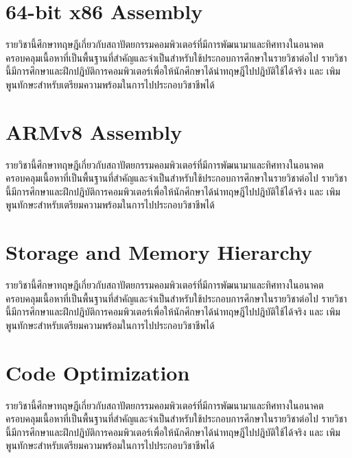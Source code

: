 \documentclass[
  notoc %
]{tufte-book}
\begin{document}
\hypertarget{sec:x86_64assembly}{%
\chapter{64-bit x86 Assembly}\label{sec:x86_64assembly}}

รายวิชานี้ศึกษาทฤษฎีเกี่ยวกับสถาปัตยกรรมคอมพิวเตอร์ที่มีการพัฒนามาและทิศทางในอนาคต
ครอบคลุมเนื้อหาที่เป็นพื้นฐานที่สำคัญและจำเป็นสำหรับใช้ประกอบการศึกษาในรายวิชาต่อไป
รายวิชานี้มีการศึกษาและฝึกปฎิบัติการคอมพิวเตอร์เพื่อให้นักศึกษาได้นำทฤษฎีไปปฎิบัติใช้ได้จริง
และ เพิมพูนทักษะสำหรับเตรียมความพร้อมในการไปประกอบวิชาชีพได้

\hypertarget{sec:armv8assembly}{%
\chapter{ARMv8 Assembly}\label{sec:armv8assembly}}

รายวิชานี้ศึกษาทฤษฎีเกี่ยวกับสถาปัตยกรรมคอมพิวเตอร์ที่มีการพัฒนามาและทิศทางในอนาคต
ครอบคลุมเนื้อหาที่เป็นพื้นฐานที่สำคัญและจำเป็นสำหรับใช้ประกอบการศึกษาในรายวิชาต่อไป
รายวิชานี้มีการศึกษาและฝึกปฎิบัติการคอมพิวเตอร์เพื่อให้นักศึกษาได้นำทฤษฎีไปปฎิบัติใช้ได้จริง
และ เพิมพูนทักษะสำหรับเตรียมความพร้อมในการไปประกอบวิชาชีพได้

\hypertarget{sec:storagememorg}{%
\chapter{Storage and Memory Hierarchy}\label{sec:storagememorg}}

รายวิชานี้ศึกษาทฤษฎีเกี่ยวกับสถาปัตยกรรมคอมพิวเตอร์ที่มีการพัฒนามาและทิศทางในอนาคต
ครอบคลุมเนื้อหาที่เป็นพื้นฐานที่สำคัญและจำเป็นสำหรับใช้ประกอบการศึกษาในรายวิชาต่อไป
รายวิชานี้มีการศึกษาและฝึกปฎิบัติการคอมพิวเตอร์เพื่อให้นักศึกษาได้นำทฤษฎีไปปฎิบัติใช้ได้จริง
และ เพิมพูนทักษะสำหรับเตรียมความพร้อมในการไปประกอบวิชาชีพได้

\hypertarget{sec:codeopt}{%
\chapter{Code Optimization}\label{sec:codeopt}}

รายวิชานี้ศึกษาทฤษฎีเกี่ยวกับสถาปัตยกรรมคอมพิวเตอร์ที่มีการพัฒนามาและทิศทางในอนาคต
ครอบคลุมเนื้อหาที่เป็นพื้นฐานที่สำคัญและจำเป็นสำหรับใช้ประกอบการศึกษาในรายวิชาต่อไป
รายวิชานี้มีการศึกษาและฝึกปฎิบัติการคอมพิวเตอร์เพื่อให้นักศึกษาได้นำทฤษฎีไปปฎิบัติใช้ได้จริง
และ เพิมพูนทักษะสำหรับเตรียมความพร้อมในการไปประกอบวิชาชีพได้
\end{document}
